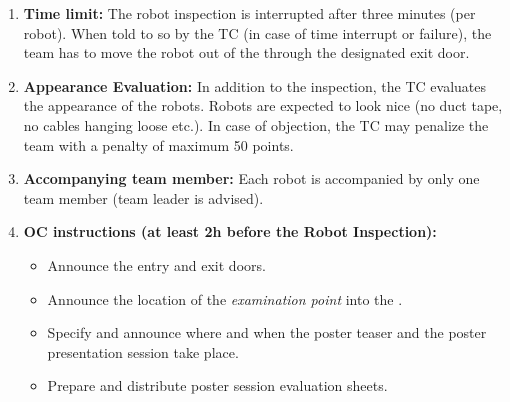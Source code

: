 \begin{enumerate}
	\item \textbf{Time limit:} The robot inspection is interrupted after three minutes (per robot). When told to so by the TC (in case of time interrupt or failure), the team has to move the robot out of the \Arena{} through the designated exit door.
	\item \textbf{Appearance Evaluation:} In addition to the inspection, the TC evaluates the appearance of the robots. Robots are expected to look nice (no duct tape, no cables hanging loose etc.). In case of objection, the TC may penalize the team with a penalty of maximum 50 points.
	\item \textbf{Accompanying team member:} Each robot is accompanied by only one team member (team leader is advised).
	\item \textbf{OC instructions (at least 2h before the Robot Inspection):}
	\begin{itemize}
		\item Announce the entry and exit doors.
		\item Announce the location of the \textit{examination point} into the \Arena{}.
		\item Specify and announce where and when the poster teaser and the poster presentation session take place.
		\item Prepare and distribute poster session evaluation sheets.
	\end{itemize}
\end{enumerate}



